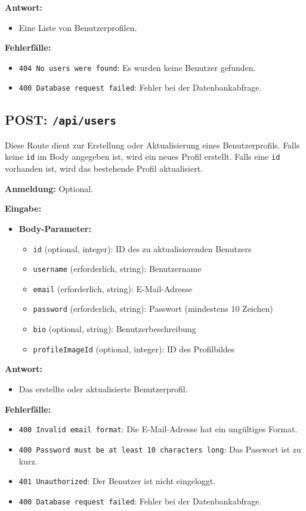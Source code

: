\documentclass[a4paper,12pt]{article}
\begin{document}
\textbf{Antwort:}
\begin{itemize}
    \item Eine Liste von Benutzerprofilen.
\end{itemize}

\textbf{Fehlerfälle:}
\begin{itemize}
    \item \texttt{404 No users were found}: Es wurden keine Benutzer gefunden.
    \item \texttt{400 Database request failed}: Fehler bei der Datenbankabfrage.
\end{itemize}

\subsection{POST: \texttt{/api/users}}

Diese Route dient zur Erstellung oder Aktualisierung eines Benutzerprofils. Falls keine \texttt{id} im Body angegeben ist, wird ein neues Profil erstellt. Falls eine \texttt{id} vorhanden ist, wird das bestehende Profil aktualisiert.

\textbf{Anmeldung:} Optional.

\textbf{Eingabe:}
\begin{itemize}
    \item \textbf{Body-Parameter:}
    \begin{itemize}
        \item \texttt{id} (optional, integer): ID des zu aktualisierenden Benutzers
        \item \texttt{username} (erforderlich, string): Benutzername
        \item \texttt{email} (erforderlich, string): E-Mail-Adresse
        \item \texttt{password} (erforderlich, string): Passwort (mindestens 10 Zeichen)
        \item \texttt{bio} (optional, string): Benutzerbeschreibung
        \item \texttt{profileImageId} (optional, integer): ID des Profilbildes
    \end{itemize}
\end{itemize}

\textbf{Antwort:}
\begin{itemize}
    \item Das erstellte oder aktualisierte Benutzerprofil.
\end{itemize}

\textbf{Fehlerfälle:}
\begin{itemize}
    \item \texttt{400 Invalid email format}: Die E-Mail-Adresse hat ein ungültiges Format.
    \item \texttt{400 Password must be at least 10 characters long}: Das Passwort ist zu kurz.
    \item \texttt{401 Unauthorized}: Der Benutzer ist nicht eingeloggt.
    \item \texttt{400 Database request failed}: Fehler bei der Datenbankabfrage.
\end{itemize}
\end{document}
